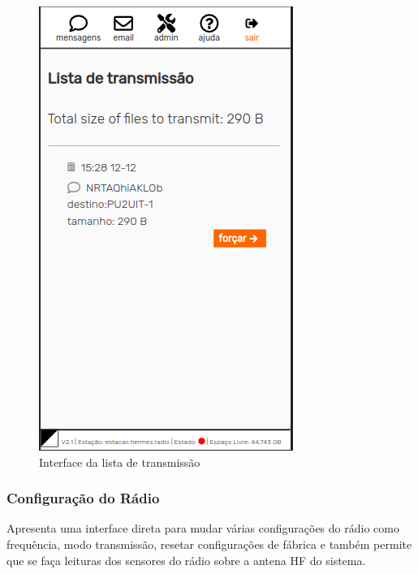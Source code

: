 \documentclass[11pt,a4paper]{article}
\begin{document}
    \begin{figure}[H]
    \centering
    \includegraphics[width=0.5\columnwidth]{screenshots/frontend/pt_kn/transmission.png}
    \caption{Interface da lista de transmissão}
    \label{fig:transmission}
   
    \end{figure}    
    
    
\subsubsection{Configuração do Rádio}
\label{gui_radio_config}

Apresenta uma interface direta para mudar várias configurações do rádio como frequência, modo transmissão, resetar configurações de fábrica e também permite que se faça leituras dos sensores do rádio sobre a antena HF do sistema.

\end{document}
